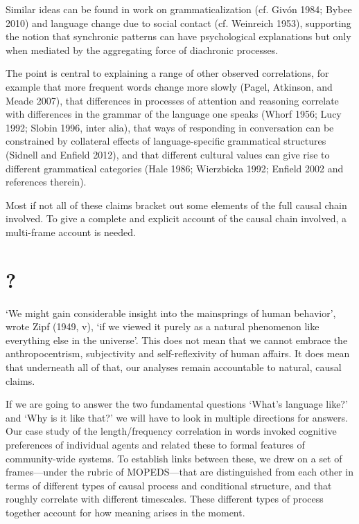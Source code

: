 Similar ideas can be found in work on grammaticalization (cf. Giv\'{o}n 
1984; Bybee 2010) and language change due to social contact (cf. 
Weinreich 1953), supporting the notion that synchronic patterns can have 
psychological explanations but only when mediated by the aggregating 
force of diachronic processes. 



The point is central to explaining a range of other observed 
correlations, for example that more frequent words change more slowly 
(Pagel, Atkinson, and Meade 2007), that differences in processes of 
attention and reasoning correlate with differences in the grammar of the 
language one speaks (Whorf 1956; Lucy 1992; Slobin 1996, inter alia), 
that ways of responding in conversation can be constrained by collateral 
effects of language-specific grammatical structures (Sidnell and Enfield 
2012), and that different cultural values can give rise to different 
grammatical categories (Hale 1986; Wierzbicka 1992; Enfield 2002 and 
references therein). 



Most if not all of these claims bracket out some elements of the full 
causal chain involved. To give a complete and explicit account of the 
causal chain involved, a multi-frame account is needed.



\section{?}


\textquoteleft We might gain considerable insight into the mainsprings of human 
behavior', wrote Zipf (1949, v), \textquoteleft if we viewed it purely as a natural 
phenomenon like everything else in the universe'. This does not mean 
that we cannot embrace the anthropocentrism, subjectivity and 
self-reflexivity of human affairs. It does mean that underneath all of 
that, our analyses remain accountable to natural, causal claims. 



If we are going to answer the two fundamental questions \textquoteleft What's language 
like?' and \textquoteleft Why is it like that?' we will have to look in multiple 
directions for answers. Our case study of the length/frequency 
correlation in words invoked cognitive preferences of individual agents 
and related these to formal features of community-wide systems. To 
establish links between these, we drew on a set of frames---under the 
rubric of MOPEDS---that are distinguished from each other in terms 
of different types of causal process and conditional structure, and that 
roughly correlate with different timescales. These different types of 
process together account for how meaning arises in the moment. \newpage